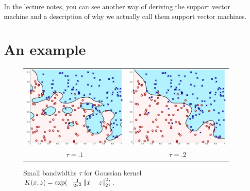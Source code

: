 \documentclass{article}
\begin{document}
In the lecture notes, you can see another way of deriving the support
vector machine and a description of why we actually call
them support vector machines.

\section{An example}

\begin{figure}[ht]
  \begin{center}
    \begin{tabular}{cc}
      \hspace{-2cm}
      \includegraphics[width=.6\columnwidth,clip]{kernel_train_0.100.eps} &
      \hspace{-.5cm}
      \includegraphics[width=.6\columnwidth,clip]{kernel_train_0.200.eps} \\
      \hspace{-2cm} $\tau = .1$ & \hspace{-.5cm} $\tau = .2$
    \end{tabular}
    \caption{\label{fig:kernel-bandwidths-small} Small bandwidths 
      $\tau$ for Gaussian kernel  $K(x, z) = \exp(-\frac{1}{2 \tau^2}
      \left\|{x - z}\right\|_2^2)$.}
  \end{center}
\end{figure}
\end{document}
